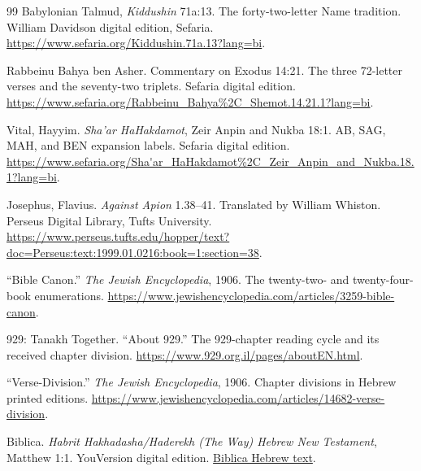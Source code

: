\begin{thebibliography}{99}
Babylonian Talmud, \textit{Kiddushin} 71a:13.
The forty-two-letter Name tradition.
William Davidson digital edition, Sefaria.
\url{https://www.sefaria.org/Kiddushin.71a.13?lang=bi}.

Rabbeinu Bahya ben Asher.
Commentary on Exodus 14:21.
The three 72-letter verses and the seventy-two triplets.
Sefaria digital edition.
\url{https://www.sefaria.org/Rabbeinu_Bahya%2C_Shemot.14.21.1?lang=bi}.

Vital, Hayyim.
\textit{Sha'ar HaHakdamot}, Zeir Anpin and Nukba 18:1.
AB, SAG, MAH, and BEN expansion labels.
Sefaria digital edition.
\url{https://www.sefaria.org/Sha'ar_HaHakdamot%2C_Zeir_Anpin_and_Nukba.18.1?lang=bi}.

Josephus, Flavius.
\textit{Against Apion} 1.38--41.
Translated by William Whiston.
Perseus Digital Library, Tufts University.
\url{https://www.perseus.tufts.edu/hopper/text?doc=Perseus:text:1999.01.0216:book=1:section=38}.

``Bible Canon.''
\textit{The Jewish Encyclopedia}, 1906.
The twenty-two- and twenty-four-book enumerations.
\url{https://www.jewishencyclopedia.com/articles/3259-bible-canon}.

929: Tanakh Together.
``About 929.''
The 929-chapter reading cycle and its received chapter division.
\url{https://www.929.org.il/pages/aboutEN.html}.

``Verse-Division.''
\textit{The Jewish Encyclopedia}, 1906.
Chapter divisions in Hebrew printed editions.
\url{https://www.jewishencyclopedia.com/articles/14682-verse-division}.

Biblica.
\textit{Habrit Hakhadasha/Haderekh (The Way) Hebrew New Testament}, Matthew 1:1.
YouVersion digital edition.
\href{https://www.bible.com/bible/24/MAT.1.HD}{Biblica Hebrew text}.

\end{thebibliography}
